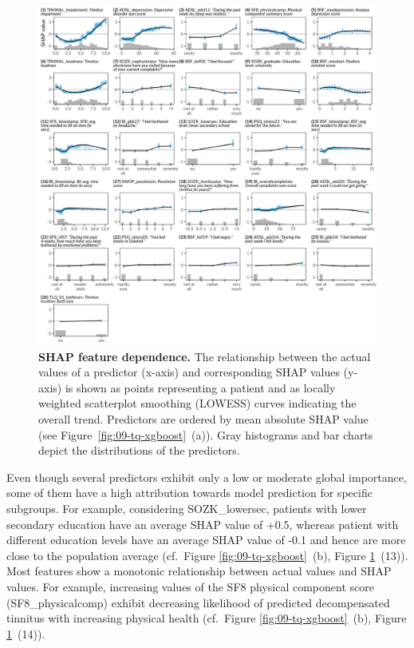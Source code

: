 \documentclass[
  oneside]{book}
\begin{document}
\begin{figure}[htbp]

{\centering \includegraphics[width=1\linewidth]{figures/09-tq-xgboost-shap-per-feature} 

}

\caption{\textbf{SHAP feature dependence.} The relationship between the actual values of a predictor (x-axis) and corresponding SHAP values (y-axis) is shown as points representing a patient and as locally weighted scatterplot smoothing (LOWESS) curves indicating the overall trend. Predictors are ordered by mean absolute SHAP value (see Figure~\ref{fig:09-tq-xgboost}~(a)). Gray histograms and bar charts depict the distributions of the predictors.}\label{fig:09-tq-xgboost-shap-per-feature}
\end{figure}

Even though several predictors exhibit only a low or moderate global importance, some of them have a high attribution towards model prediction for specific subgroups.
For example, considering SOZK\_lowersec, patients with lower secondary education have an average SHAP value of +0.5, whereas patient with different education levels have an average SHAP value of -0.1 and hence are more close to the population average (cf.~Figure \ref{fig:09-tq-xgboost}~(b), Figure \ref{fig:09-tq-xgboost-shap-per-feature}~(13)).
Most features show a monotonic relationship between actual values and SHAP values.
For example, increasing values of the SF8 physical component score (SF8\_physicalcomp) exhibit decreasing likelihood of predicted decompensated tinnitus with increasing physical health (cf.~Figure \ref{fig:09-tq-xgboost}~(b), Figure \ref{fig:09-tq-xgboost-shap-per-feature}~(14)).
\end{document}

